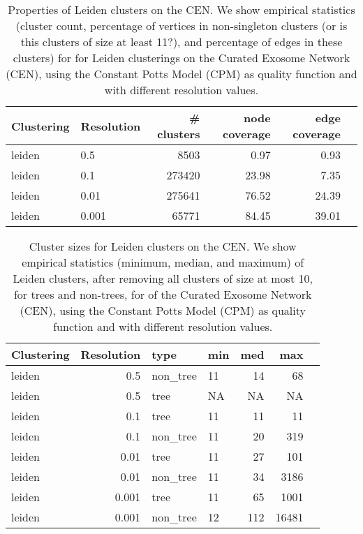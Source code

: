 \documentclass[12pt, oneside]{article}   	%
\begin{document}
\begin{table}[ht]
\centering
\begin{tabular}{llrrrr}
  \hline
 Clustering  & Resolution &  \# clusters & node coverage & edge coverage \\ 
  \hline
leiden &  0.5 & 8503 & 0.97 & 0.93 \\ 
leiden&  0.1 & 273420 & 23.98 & 7.35 \\ 
leiden & 0.01 & 275641 & 76.52 & 24.39 \\   
leiden& 0.001 & 65771 & 84.45 & 39.01 \\ 
   \hline
\end{tabular}
\caption{Properties of Leiden clusters on the CEN. We show empirical statistics  (cluster count, percentage of vertices in non-singleton clusters (or is this clusters of size at least 11?), and percentage of edges in these clusters) for for Leiden clusterings on the Curated Exosome Network (CEN), using the Constant Potts Model (CPM) as quality function and with different resolution values.
\label{table1}
 }
\end{table} 

\begin{table}[ht]
\centering
\begin{tabular}{lrllrrr}
  \hline
 Clustering & Resolution & type & min & med & max \\ 
  \hline
leiden & 0.5 & non\_tree &  11 & 14 &  68 \\ 
leiden & 0.5 & tree &  NA & NA &  NA \\ 
leiden & 0.1 & tree &  11 & 11 &  11 \\ 
leiden  & 0.1 & non\_tree &  11 & 20 & 319 \\ 
leiden  & 0.01 & tree &  11 & 27 & 101 \\ 
leiden & 0.01 & non\_tree &  11 & 34 & 3186 \\ 
leiden & 0.001 & tree &  11 & 65 & 1001 \\ 
leiden & 0.001 & non\_tree &  12 & 112 & 16481 \\ 

   \hline
\end{tabular}
\caption{Cluster sizes for Leiden clusters on the CEN. We show empirical statistics (minimum, median, and maximum) of Leiden clusters, after removing all clusters of size at most 10,  for trees and non-trees, for of the Curated Exosome Network (CEN),  using the Constant Potts Model (CPM) as quality function and with different resolution values.  }
\end{table}
\end{document}
